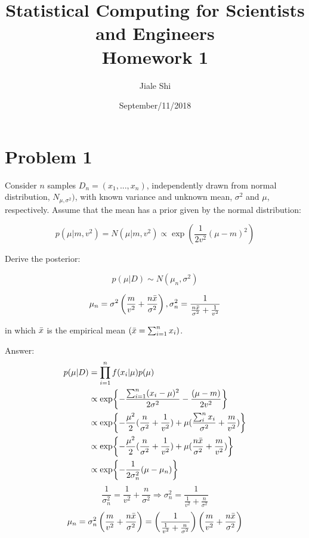 \documentclass{article}
\title{Statistical Computing for Scientists and Engineers\\[1em] Homework 1}
\author{Jiale Shi}
\date{September/11/2018}
\begin{document}
\maketitle

\newpage
\section{Problem 1}
Consider $n$ samples $D_{n} = (x_{1},...,x_{n})$, independently drawn from normal distribution, $N_{\mu, \sigma^{2}})$, with known variance and unknown mean, $\sigma^{2}$ and $\mu$, respectively. Assume that the mean has a prior given by the normal distribution:

\begin{equation}
p(\mu|m,v^{2})= N(\mu|m,v^{2}) \propto \exp(\frac{1}{2v^{2}} (\mu-m)^2)
\end{equation}

Derive the posterior:

\begin{equation}
p(\mu|D) \sim N(\mu_{n},\sigma^{2}) 
\end{equation}

\begin{equation}
\mu_{n} = \sigma^{2}\left(\frac{m}{v^{2}}+\frac{n\Bar{x}}{\sigma^{2}}\right), \sigma_{n}^{2} = \frac{1}{\frac{n\Bar{x}}{\sigma^{2}}+\frac{1}{v^2}}
\end{equation}

in which $\Bar{x}$ is the empirical mean $(\Bar{x}=\sum^n_{i=1}x_{i})$.

Answer:
\begin{equation}
\begin{aligned}
    p(\mu|D) &= \prod_{i=1}^{n} f(x_{i}|\mu) p(\mu) \\
    &\propto \exp{-\frac{\sum_{i=1}^{n}(x_{i}-\mu)^2}{2\sigma^{2}} - \frac{(\mu-m)}{2v^2}} \\
     &\propto \exp{-\frac{\mu^2}{2}(\frac{n}{\sigma^2}+\frac{1}{v^2})+\mu(\frac{\sum_{i}^{n}x_i}{\sigma^2}+\frac{m}{v^2})} \\
    &\propto \exp{-\frac{\mu^2}{2}(\frac{n}{\sigma^2}+\frac{1}{v^2})+\mu(\frac{n\Bar{x}}{\sigma^2}+\frac{m}{v^2})} \\
    &\propto \exp{-\frac{1}{2\sigma_{n}^{2}}(\mu-\mu_{n})}
\end{aligned}
\end{equation}
\begin{equation}
\frac{1}{\sigma_{n}^{2}} = \frac{1}{v^2}+\frac{n}{\sigma^2} \Rightarrow{} \sigma_{n}^{2} = \frac{1}{\frac{1}{v^2}+\frac{n}{\sigma^2}}
\end{equation}
\begin{equation}
    \mu_n = \sigma_{n}^2\left(\frac{m}{v^2}+\frac{n\Bar{x}}{\sigma^2}\right) = \left(\frac{1}{\frac{1}{v^2}+\frac{n}{\sigma^2}}\right)\left(\frac{m}{v^2}+\frac{n\Bar{x}}{\sigma^2}\right)
\end{equation}
\end{document}
